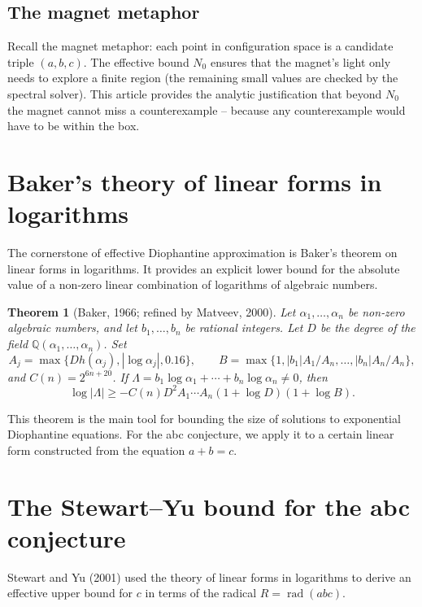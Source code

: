 \documentclass[11pt,a4paper]{article}
\newtheorem{theorem}{Theorem}[section]
\begin{document}
\subsection{The magnet metaphor}

Recall the magnet metaphor: each point in configuration space is a candidate triple \((a,b,c)\). The effective bound \(N_0\) ensures that the magnet's light only needs to explore a finite region (the remaining small values are checked by the spectral solver). This article provides the analytic justification that beyond \(N_0\) the magnet cannot miss a counterexample – because any counterexample would have to be within the box.

\section{Baker's theory of linear forms in logarithms}

The cornerstone of effective Diophantine approximation is Baker's theorem on linear forms in logarithms. It provides an explicit lower bound for the absolute value of a non‑zero linear combination of logarithms of algebraic numbers.

\begin{theorem}[Baker, 1966; refined by Matveev, 2000]
\label{thm:matveev}
Let \(\alpha_1,\dots,\alpha_n\) be non‑zero algebraic numbers, and let \(b_1,\dots,b_n\) be rational integers. Let \(D\) be the degree of the field \(\mathbb{Q}(\alpha_1,\dots,\alpha_n)\). Set
\[
A_j = \max\{D h(\alpha_j), |\log\alpha_j|, 0.16\},\qquad
B = \max\{1, |b_1| A_1/A_n, \dots, |b_n| A_n/A_n\},
\]
and \(C(n) = 2^{6n+20}\). If \(\Lambda = b_1\log\alpha_1 + \cdots + b_n\log\alpha_n \neq 0\), then
\[
\log|\Lambda| \ge -C(n) D^2 A_1 \cdots A_n (1+\log D)(1+\log B).
\]
\end{theorem}

This theorem is the main tool for bounding the size of solutions to exponential Diophantine equations. For the abc conjecture, we apply it to a certain linear form constructed from the equation \(a+b=c\).

\section{The Stewart–Yu bound for the abc conjecture}

Stewart and Yu (2001) used the theory of linear forms in logarithms to derive an effective upper bound for \(c\) in terms of the radical \(R = \operatorname{rad}(abc)\).
\end{document}
